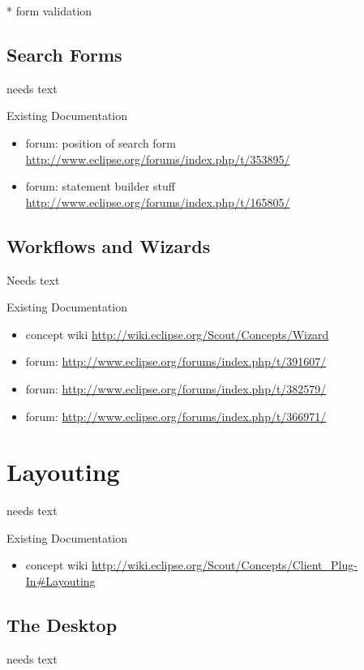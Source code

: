 \documentclass[a4paper,10pt,twoside]{book}
\begin{document}
	* form validation
	
\section{Search Forms}
needs text

\noindent Existing Documentation
\begin{itemize}
  \item forum: position of search form \url{http://www.eclipse.org/forums/index.php/t/353895/}
  \item forum: statement builder stuff \url{http://www.eclipse.org/forums/index.php/t/165805/}
\end{itemize}

\section{Workflows and Wizards}
Needs text

\noindent Existing Documentation
\begin{itemize}
  \item concept wiki \url{http://wiki.eclipse.org/Scout/Concepts/Wizard}
  \item forum: \url{http://www.eclipse.org/forums/index.php/t/391607/}
  \item forum: \url{http://www.eclipse.org/forums/index.php/t/382579/}
  \item forum: \url{http://www.eclipse.org/forums/index.php/t/366971/}
\end{itemize}




\chapter{Layouting}
needs text

\noindent Existing Documentation
\begin{itemize}
  \item concept wiki \url{http://wiki.eclipse.org/Scout/Concepts/Client_Plug-In#Layouting}
\end{itemize}

\section{The Desktop}
needs text
\end{document}
